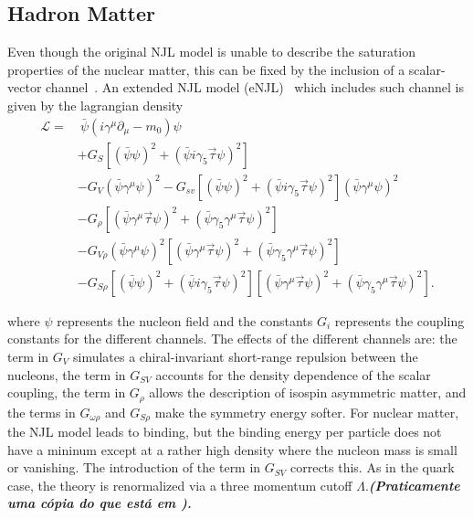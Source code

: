 \documentclass[prc, reprint, amsmath, floatfix, linenumbers,10pt]{revtex4-1}
\newcommand{\comment}[1]{{\bf\textit{#1}}}
\begin{document}
\subsection{Hadron Matter}

Even though the original NJL model is unable to describe the saturation properties of the nuclear matter, this can be fixed by the inclusion of a scalar-vector channel~\cite{Koch1987}. An extended NJL model (eNJL)~\cite{Pais2016} which includes such channel is given by the lagrangian density
\begin{equation}\label{Eq:Lagrangiana_eNLJ_Pais}
\begin{split}
	\mathcal{L} =&~ \bar{\psi}(i\gamma^\mu\partial_\mu - m_0)\psi \\
	& + G_S[(\bar{\psi}\psi)^2 + (\bar{\psi}i\gamma_5\vec{\tau}\psi)^2] \\
	& - G_V(\bar{\psi}\gamma^\mu\psi)^2 - G_{sv}[(\bar{\psi}\psi)^2 + (\bar{\psi}i\gamma_5\vec{\tau}\psi)^2](\bar{\psi}\gamma^\mu\psi)^2 \\
	& - G_\rho[(\bar{\psi}\gamma^\mu\vec{\tau}\psi)^2 + (\bar{\psi}\gamma_5\gamma^\mu\vec{\tau}\psi)^2] \\
	& - G_{V\rho}(\bar{\psi}\gamma^\mu\psi)^2[(\bar{\psi}\gamma^\mu\vec{\tau}\psi)^2 + (\bar{\psi}\gamma_5\gamma^\mu\vec{\tau}\psi)^2] \\
	& - G_{S\rho} [(\bar{\psi}\psi)^2 + (\bar{\psi}i\gamma_5\vec{\tau}\psi)^2][(\bar{\psi}\gamma^\mu\vec{\tau}\psi)^2 + (\bar{\psi}\gamma_5\gamma^\mu\vec{\tau}\psi)^2].
\end{split}
\end{equation}
%

where $\psi$ represents the nucleon field and the constants $G_i$ represents the coupling constants for the different channels. The effects of the different channels are: the term in $G_V$ simulates a chiral-invariant short-range repulsion between the nucleons, the term in $G_{SV}$ accounts for the density dependence of the scalar coupling, the term in $G_\rho$ allows the description of isospin asymmetric matter, and the terms in $G_{\omega\rho}$ and $G_{S\rho}$ make the symmetry energy softer. For nuclear matter, the NJL model leads to binding, but the binding energy per particle does not have a mininum except at a rather high density where the nucleon mass is small or vanishing. The introduction of the term in $G_{SV}$ corrects this. As in the quark case, the theory is renormalized via a three momentum cutoff $\Lambda$.\comment{(Praticamente uma cópia do que está em \cite{Pais2016}).}
\end{document}
